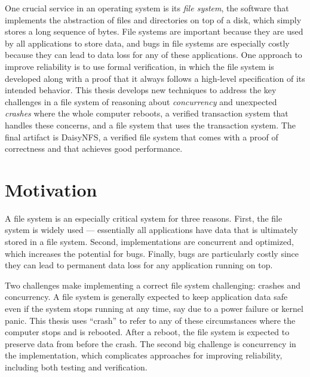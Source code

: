 One crucial service in an operating system is its \emph{file system}, the
software that implements the abstraction of files and directories on top of a
disk, which simply stores a long sequence of bytes. File systems are important
because they are used by all applications to store data, and bugs in file
systems are especially costly because they can lead to data loss for any of
these applications. One approach to improve reliability is to use formal
verification, in which the file system is developed along with a proof that it
always follows a high-level specification of its intended behavior. This thesis
develops new techniques to address the key challenges in a file system of
reasoning about \emph{concurrency} and unexpected \emph{crashes} where the whole
computer reboots, a verified transaction system that handles these concerns, and
a file system that uses the transaction system. The final artifact is DaisyNFS,
a verified file system that comes with a proof of correctness and that achieves
good performance.

\section{Motivation}
\label{sec:intro:motivation}

A file system is an especially critical system for
three reasons. First, the file system is widely used --- essentially all applications have
data that is ultimately stored in a file system. Second, implementations are
concurrent and optimized, which increases the potential for bugs. Finally, bugs
are particularly costly since they can lead to permanent data loss for any
application running on top.

Two challenges make implementing a correct file system challenging: crashes and
concurrency. A file system is generally expected to keep application data safe
even if the system stops running at any time, say due to a power failure or
kernel panic. This thesis uses ``crash'' to refer to any of these circumstances
where the computer stops and is rebooted. After a reboot, the file system is
expected to preserve data from before the crash. The second big challenge is
concurrency in the implementation, which complicates approaches for improving
reliability, including both testing and verification.


